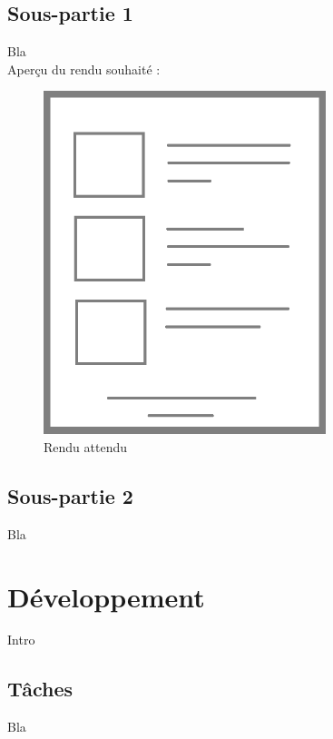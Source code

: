 \subsection{Sous-partie 1}

Bla\\

Aperçu du rendu souhaité :

\begin{figure}[!h]
\begin{center}
\includegraphics[height=10cm]{besoins/rendu}
\end{center}
\caption{Rendu attendu}
\end{figure}

\subsection{Sous-partie 2}

Bla

\newpage

\section{Développement}

Intro

\subsection{Tâches}

Bla\\


